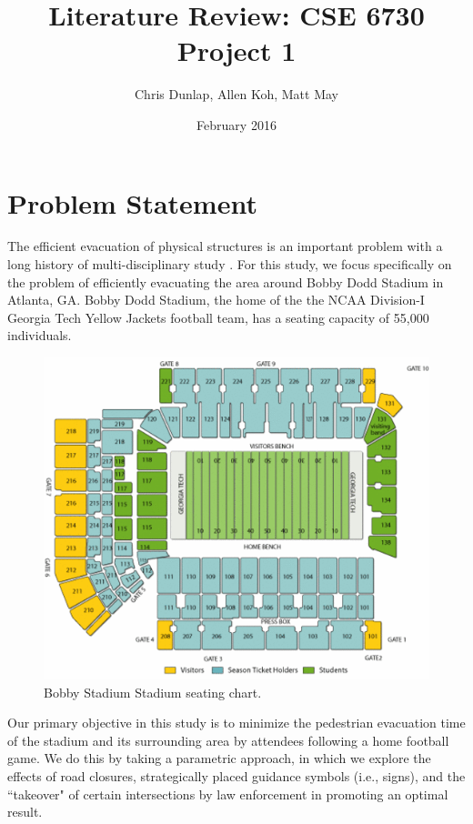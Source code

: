 \documentclass[12pt]{article}
\title{Literature Review: CSE 6730 Project 1}
\author{Chris Dunlap, Allen Koh, Matt May}
\date{February 2016}
\begin{document}
\begin{titlepage}
\maketitle
\thispagestyle{empty}
\end{titlepage}

\section{Problem Statement}
\label{sec:problem}

The efficient evacuation of physical structures is an important problem with a
long history of multi-disciplinary study \cite{zheng2009modeling}. For this
study, we focus specifically on the problem of efficiently evacuating the
area around Bobby Dodd Stadium in Atlanta, GA. Bobby Dodd Stadium, the home of
the the NCAA Division-I Georgia Tech Yellow Jackets football team, has a
seating capacity of 55,000 individuals.

\begin{figure}[H]
  \includegraphics[width=\linewidth,natwidth=521,natheight=435]{stadium_diagram_updated.png}
  \caption{Bobby Stadium Stadium seating chart.}
  \label{fig:polygon}
\end{figure}

Our primary objective in this study is to minimize the pedestrian evacuation
time of the stadium and its surrounding area by attendees following a home
football game. We do this by taking a parametric approach, in which we explore
the effects of road closures, strategically placed guidance symbols
(i.e., signs), and the ``takeover" of certain intersections by law enforcement
in promoting an optimal result.
\end{document}
